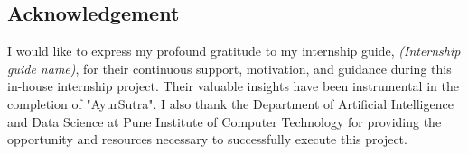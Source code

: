 \documentclass[10pt]{article}
\begin{document}
\newpage
\begin{titlepage}

\section*{Acknowledgement}
I would like to express my profound gratitude to my internship guide, \textit{(Internship guide name)}, for their continuous support, motivation, and guidance during this in-house internship project. Their valuable insights have been instrumental in the completion of "AyurSutra". I also thank the Department of Artificial Intelligence and Data Science at Pune Institute of Computer Technology for providing the opportunity and resources necessary to successfully execute this project.

\end{titlepage}
\end{document}
